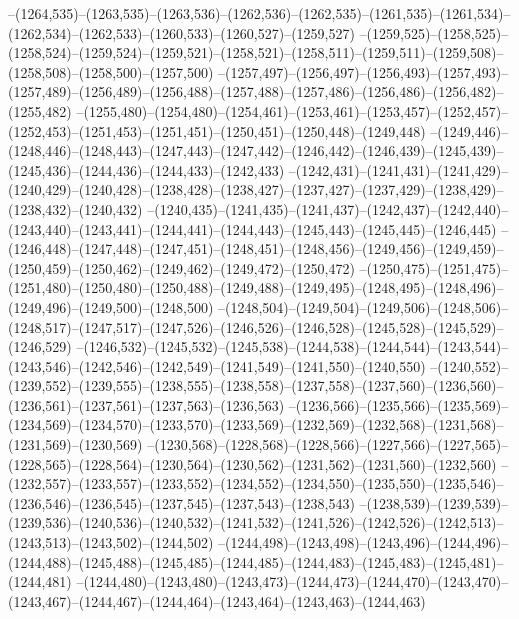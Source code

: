 --(1264,535)--(1263,535)--(1263,536)--(1262,536)--(1262,535)--(1261,535)--(1261,534)--(1262,534)--(1262,533)--(1260,533)--(1260,527)--(1259,527)
--(1259,525)--(1258,525)--(1258,524)--(1259,524)--(1259,521)--(1258,521)--(1258,511)--(1259,511)--(1259,508)--(1258,508)--(1258,500)--(1257,500)
--(1257,497)--(1256,497)--(1256,493)--(1257,493)--(1257,489)--(1256,489)--(1256,488)--(1257,488)--(1257,486)--(1256,486)--(1256,482)--(1255,482)
--(1255,480)--(1254,480)--(1254,461)--(1253,461)--(1253,457)--(1252,457)--(1252,453)--(1251,453)--(1251,451)--(1250,451)--(1250,448)--(1249,448)
--(1249,446)--(1248,446)--(1248,443)--(1247,443)--(1247,442)--(1246,442)--(1246,439)--(1245,439)--(1245,436)--(1244,436)--(1244,433)--(1242,433)
--(1242,431)--(1241,431)--(1241,429)--(1240,429)--(1240,428)--(1238,428)--(1238,427)--(1237,427)--(1237,429)--(1238,429)--(1238,432)--(1240,432)
--(1240,435)--(1241,435)--(1241,437)--(1242,437)--(1242,440)--(1243,440)--(1243,441)--(1244,441)--(1244,443)--(1245,443)--(1245,445)--(1246,445)
--(1246,448)--(1247,448)--(1247,451)--(1248,451)--(1248,456)--(1249,456)--(1249,459)--(1250,459)--(1250,462)--(1249,462)--(1249,472)--(1250,472)
--(1250,475)--(1251,475)--(1251,480)--(1250,480)--(1250,488)--(1249,488)--(1249,495)--(1248,495)--(1248,496)--(1249,496)--(1249,500)--(1248,500)
--(1248,504)--(1249,504)--(1249,506)--(1248,506)--(1248,517)--(1247,517)--(1247,526)--(1246,526)--(1246,528)--(1245,528)--(1245,529)--(1246,529)
--(1246,532)--(1245,532)--(1245,538)--(1244,538)--(1244,544)--(1243,544)--(1243,546)--(1242,546)--(1242,549)--(1241,549)--(1241,550)--(1240,550)
--(1240,552)--(1239,552)--(1239,555)--(1238,555)--(1238,558)--(1237,558)--(1237,560)--(1236,560)--(1236,561)--(1237,561)--(1237,563)--(1236,563)
--(1236,566)--(1235,566)--(1235,569)--(1234,569)--(1234,570)--(1233,570)--(1233,569)--(1232,569)--(1232,568)--(1231,568)--(1231,569)--(1230,569)
--(1230,568)--(1228,568)--(1228,566)--(1227,566)--(1227,565)--(1228,565)--(1228,564)--(1230,564)--(1230,562)--(1231,562)--(1231,560)--(1232,560)
--(1232,557)--(1233,557)--(1233,552)--(1234,552)--(1234,550)--(1235,550)--(1235,546)--(1236,546)--(1236,545)--(1237,545)--(1237,543)--(1238,543)
--(1238,539)--(1239,539)--(1239,536)--(1240,536)--(1240,532)--(1241,532)--(1241,526)--(1242,526)--(1242,513)--(1243,513)--(1243,502)--(1244,502)
--(1244,498)--(1243,498)--(1243,496)--(1244,496)--(1244,488)--(1245,488)--(1245,485)--(1244,485)--(1244,483)--(1245,483)--(1245,481)--(1244,481)
--(1244,480)--(1243,480)--(1243,473)--(1244,473)--(1244,470)--(1243,470)--(1243,467)--(1244,467)--(1244,464)--(1243,464)--(1243,463)--(1244,463)

